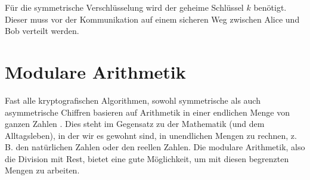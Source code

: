 \noindent
Für die symmetrische Verschlüsselung wird der geheime Schlüssel $k$ benötigt. Dieser
muss vor der Kommunikation auf einem sicheren Weg zwischen Alice und Bob verteilt werden.

\section{Modulare Arithmetik}
Fast alle kryptografischen Algorithmen, sowohl symmetrische als auch asymmetrische Chiffren
basieren auf Arithmetik in einer endlichen Menge von ganzen Zahlen \parencite[13]{BOOK:crypto}.
Dies steht im Gegensatz zu der Mathematik (und dem Alltagsleben),
in der wir es gewohnt sind, in unendlichen
Mengen zu rechnen, z.\,B. den natürlichen Zahlen oder den reellen Zahlen. Die modulare Arithmetik,
also die Division mit Rest, bietet eine gute Möglichkeit, um mit diesen begrenzten Mengen
zu arbeiten.

